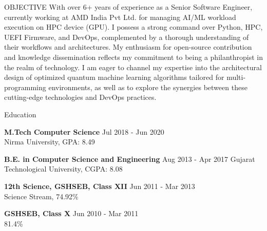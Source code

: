 \documentclass{resume} %
\begin{document}

\begin{rSection}{OBJECTIVE}
{With over 6+ years of experience as a Senior Software Engineer, currently working at AMD India Pvt Ltd. for managing AI/ML workload execution on HPC device (GPU). I possess a strong command over Python, HPC, UEFI Firmware, and DevOps, complemented by a thorough understanding of their workflows and architectures. My enthusiasm for open-source contribution and knowledge dissemination reflects my commitment to being a philanthropist in the realm of technology. I am eager to channel my expertise into the architectural design of optimized quantum machine learning algorithms tailored for multi-programming environments, as well as to explore the synergies between these cutting-edge technologies and DevOps practices.}

\end{rSection}



\begin{rSection}{Education}

{\bf M.Tech Computer Science} \hfill {Jul 2018 - Jun 2020 }
\\ 
Nirma University, GPA: 8.49

{\bf B.E. in Computer Science and Engineering} \hfill {Aug 2013 - Apr 2017 }
Gujarat Technological University, CGPA: 8.08

{\textbf{12th Science, GSHSEB, Class XII}}  \hfill {Jun 2011 - Mar 2013 }\\
Science Stream, 74.92\% 
 
{\textbf{GSHSEB, Class X}}  \hfill {Jun 2010 - Mar 2011 }\\
81.4\%


\end{rSection}


\end{document}

